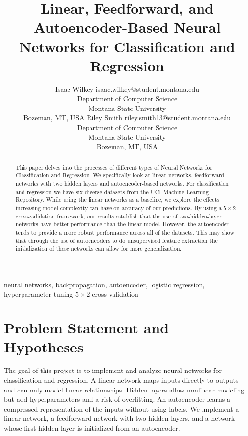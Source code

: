 \documentclass[twoside,11pt]{article}
\begin{document}
\title{Linear, Feedforward, and Autoencoder-Based Neural Networks for Classification and Regression}

\author{\name Isaac Wilkey \email isaac.wilkey@student.montana.edu\\
\addr Department of Computer Science \\
Montana State University \\
Bozeman, MT, USA
\AND
\name Riley Smith \email riley.smith13@student.montana.edu\\
\addr Department of Computer Science \\
Montana State University \\
Bozeman, MT, USA
}

\maketitle

\begin{abstract}
This paper delves into the processes of different types of Neural Networks for Classification and Regression. We specifically look at linear networks, feedforward networks with two hidden layers and autoencoder-based networks. For classification and regression we have six diverse datasets from the UCI Machine Learning Repository. While using the linear networks as a baseline, we explore the effects increasing model complexity can have on accuracy of our predictions. By using a $5 \times 2$ cross-validation framework, our results establish that the use of two-hidden-layer networks have better performance than the linear model. However, the autoencoder tends to provide a more robust performance across all of the datasets. This may show that through the use of autoencoders to do unsupervised feature extraction the initialization of these networks can allow for more generalization. 

\end{abstract}

\begin{keywords}neural networks, backpropagation, autoencoder, logistic regression, hyperparameter tuning $5 \times 2$ cross validation\end{keywords}

\section{Problem Statement and Hypotheses}
The goal of this project is to implement and analyze neural networks for classification and regression. A linear network maps inputs directly to outputs and can only model linear relationships. Hidden layers allow nonlinear modeling but add hyperparameters and a risk of overfitting. An autoencoder learns a compressed representation of the inputs without using labels. We implement a linear network, a feedforward network with two hidden layers, and a network whose first hidden layer is initialized from an autoencoder.
\end{document}

